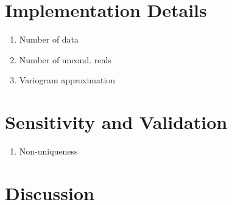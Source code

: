 \FloatBarrier
\section{Implementation Details}
\label{sec:04implementd}

\begin{enumerate}[noitemsep]
    \item Number of data
    \item Number of uncond. reals
    \item Variogram approximation
\end{enumerate}


\FloatBarrier
\section{Sensitivity and Validation}
\label{sec:04valid}

\begin{enumerate}[noitemsep]
    \item Non-uniqueness
\end{enumerate}


\FloatBarrier
\section{Discussion}
\label{sec:04discuss}